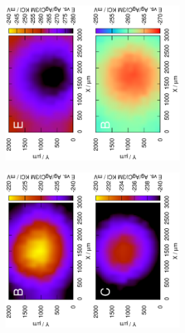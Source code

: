 \begin{figure}
\centering
\includegraphics[width=0.3\textwidth, angle=-90]{img/mérések/Fe_h_100.eps}\includegraphics[width=0.3\textwidth, angle=-90]{img/mérések/Fe_h_500.eps}

\includegraphics[width=0.3\textwidth, angle=-90]{img/mérések/Zn_h_100.eps}\includegraphics[width=0.3\textwidth, angle=-90]{img/mérések/Zn_h_500.eps}


\end{figure}

